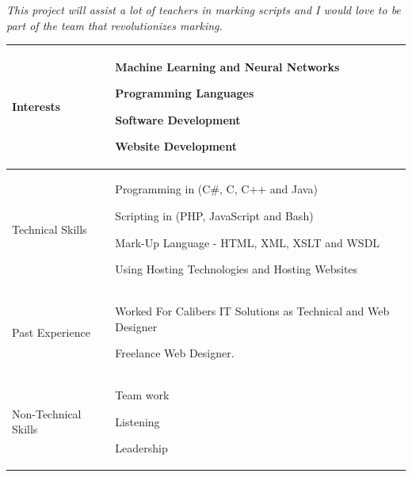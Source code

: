 \documentclass{article}
\begin{document}
 	\textit{This project will assist a lot of teachers in marking scripts and I would love to be part of the team that revolutionizes marking.}

\begin{center}
\begin{tabularx}{1.0\textwidth}{|p{3cm}|X|}
\hline
 {\LARGE Interests} & 
 \begin{compactitem}
     \item {\large Machine Learning and Neural Networks}
     \item {\large Programming Languages}
     \item {\large Software Development}
     \item {\large Website Development}
 \end{compactitem} \\ 
 \hline
 {\LARGE Technical Skills} & 
 \begin{compactitem}
     \item {\large Programming in (C#, C, C++ and Java)} 
     \item {\large Scripting in (PHP, JavaScript and Bash)}
     \item {\large Mark-Up Language - HTML, XML, XSLT and WSDL}
     \item {\large Using Hosting Technologies and Hosting Websites}
 \end{compactitem} \\ 
 \hline
 {\LARGE Past Experience} & 
 \begin{compactitem}
     \item {\large Worked For Calibers IT Solutions as Technical and Web Designer}
     \item {\large Freelance Web Designer.}
 \end{compactitem} \\ 
 \hline
 {\LARGE Non-Technical Skills} & 
 \begin{compactitem}
     \item {\large Team work}
     \item {\large Listening}
     \item {\large Leadership}
 \end{compactitem} \\
 \hline 
\end{tabularx}
\end{center}
\pagebreak
\end{document}
